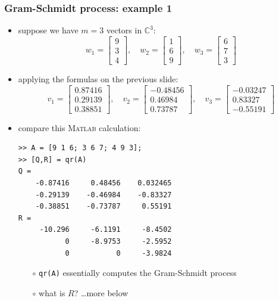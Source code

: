 \documentclass[10pt,hyperref]{beamer}
\newcommand{\CC}{\mathbb{C}}
\newcommand{\Matlab}{\textsc{Matlab}\xspace}
\begin{document}
\begin{frame}[fragile]
\frametitle{Gram-Schmidt process: example 1}

\begin{itemize}
\item suppose we have $m=3$ vectors in $\CC^3$:
\small
    $$w_1 = \begin{bmatrix} 9 \\ 3 \\ 4 \end{bmatrix}, \quad w_2 = \begin{bmatrix} 1 \\ 6 \\ 9 \end{bmatrix}, \quad w_3 = \begin{bmatrix} 6 \\ 7 \\ 3 \end{bmatrix}$$
\normalsize
\item applying the formulas on the previous slide:
\small
    $$v_1 = \begin{bmatrix} 0.87416 \\ 0.29139 \\ 0.38851 \end{bmatrix}, \quad v_2 = \begin{bmatrix} -0.48456 \\ 0.46984 \\ 0.73787 \end{bmatrix}, \quad v_3 = \begin{bmatrix} -0.03247 \\ 0.83327 \\ -0.55191 \end{bmatrix}$$
\normalsize
\item compare this \Matlab calculation:
\begin{Verbatim}[fontsize=\scriptsize]
>> A = [9 1 6; 3 6 7; 4 9 3];
>> [Q,R] = qr(A)
Q =
    -0.87416     0.48456    0.032465
    -0.29139    -0.46984    -0.83327
    -0.38851    -0.73787     0.55191
R =
     -10.296     -6.1191     -8.4502
           0     -8.9753     -2.5952
           0           0     -3.9824
\end{Verbatim}
    \begin{itemize}
    \item[$\circ$] \texttt{qr(A)} essentially computes the Gram-Schmidt process
    \item[$\circ$] what is $R$? \dots more below
    \end{itemize}
\end{itemize}
\end{frame}
\end{document}
